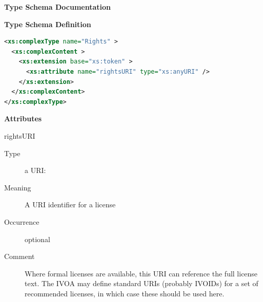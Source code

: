 \documentclass[11pt,a4paper]{ivoa}
\begin{document}
\begingroup
      	\renewcommand*\descriptionlabel[1]{%
      	\hbox to 5.5em{\emph{#1}\hfil}}\vspace{2ex}\noindent\textbf{ Type Schema Documentation}


\vspace{1ex}\noindent\textbf{ Type Schema Definition}

\begin{lstlisting}[language=XML,basicstyle=\footnotesize]
<xs:complexType name="Rights" >
  <xs:complexContent >
    <xs:extension base="xs:token" >
      <xs:attribute name="rightsURI" type="xs:anyURI" />
    </xs:extension>
  </xs:complexContent>
</xs:complexType>
\end{lstlisting}

\vspace{0.5ex}\noindent\textbf{ Attributes}

\begingroup\small\begin{bigdescription}
\item[rightsURI]
\begin{description}
\item[Type] a URI: 
\item[Meaning] 
                     A URI identifier for a license
                  
\item[Occurrence] optional
\item[Comment] 
                     Where formal licenses are available, this URI can
                     reference the full license text.  The IVOA may define
                     standard URIs (probably IVOIDs) for a set of recommended
                     licenses, in which case these should be used here.
                  
\end{description}


\end{bigdescription}\endgroup

\endgroup
\end{document}
